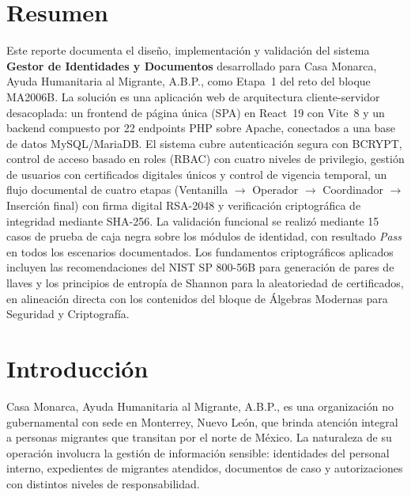 \documentclass[10pt,letterpaper]{report}
\begin{document}
\tableofcontents
\listoftables
\listoffigures
\clearpage
{}

\chapter*{Resumen}

Este reporte documenta el diseño, implementación y validación del sistema \textbf{Gestor de Identidades y Documentos} desarrollado para Casa Monarca, Ayuda Humanitaria al Migrante, A.B.P., como Etapa~1 del reto del bloque MA2006B. La solución es una aplicación web de arquitectura cliente-servidor desacoplada: un frontend de página única (SPA) en React~19 con Vite~8 y un backend compuesto por 22 endpoints PHP sobre Apache, conectados a una base de datos MySQL/MariaDB. El sistema cubre autenticación segura con BCRYPT, control de acceso basado en roles (RBAC) con cuatro niveles de privilegio, gestión de usuarios con certificados digitales únicos y control de vigencia temporal, un flujo documental de cuatro etapas (Ventanilla $\to$ Operador $\to$ Coordinador $\to$ Inserción final) con firma digital RSA-2048 y verificación criptográfica de integridad mediante SHA-256. La validación funcional se realizó mediante 15 casos de prueba de caja negra sobre los módulos de identidad, con resultado \textit{Pass} en todos los escenarios documentados. Los fundamentos criptográficos aplicados incluyen las recomendaciones del NIST SP 800-56B para generación de pares de llaves y los principios de entropía de Shannon para la aleatoriedad de certificados, en alineación directa con los contenidos del bloque de Álgebras Modernas para Seguridad y Criptografía.

\chapter{Introducción}

Casa Monarca, Ayuda Humanitaria al Migrante, A.B.P., es una organización no gubernamental con sede en Monterrey, Nuevo León, que brinda atención integral a personas migrantes que transitan por el norte de México. La naturaleza de su operación involucra la gestión de información sensible: identidades del personal interno, expedientes de migrantes atendidos, documentos de caso y autorizaciones con distintos niveles de responsabilidad.
\end{document}
